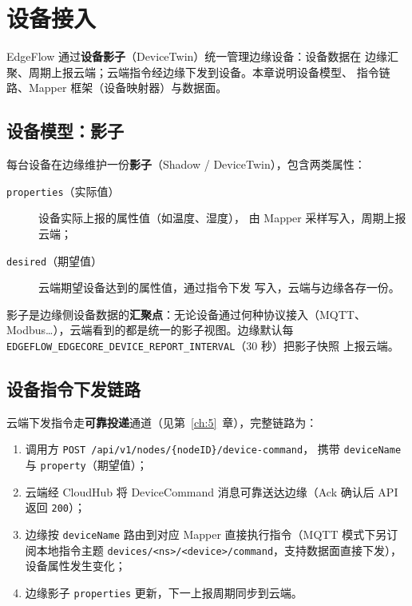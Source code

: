 \chapter{设备接入}
\label{ch:6}

EdgeFlow 通过\textbf{设备影子}（DeviceTwin）统一管理边缘设备：设备数据在
边缘汇聚、周期上报云端；云端指令经边缘下发到设备。本章说明设备模型、
指令链路、Mapper 框架（设备映射器）与数据面。

\section{设备模型：影子}

每台设备在边缘维护一份\textbf{影子}（Shadow / DeviceTwin），包含两类属性：

\begin{description}
  \item[\texttt{properties}（实际值）] 设备实际上报的属性值（如温度、湿度），
        由 Mapper 采样写入，周期上报云端；
  \item[\texttt{desired}（期望值）] 云端期望设备达到的属性值，通过指令下发
        写入，云端与边缘各存一份。
\end{description}

影子是边缘侧设备数据的\textbf{汇聚点}：无论设备通过何种协议接入（MQTT、
Modbus\ldots），云端看到的都是统一的影子视图。边缘默认每
\texttt{EDGEFLOW\_EDGECORE\_DEVICE\_REPORT\_INTERVAL}（30 秒）把影子快照
上报云端。

\section{设备指令下发链路}

云端下发指令走\textbf{可靠投递}通道（见第~\ref{ch:5}~章），完整链路为：

\begin{enumerate}
  \item 调用方 \texttt{POST /api/v1/nodes/\{nodeID\}/device-command}，
        携带 \texttt{deviceName} 与 \texttt{property}（期望值）；
  \item 云端经 CloudHub 将 DeviceCommand 消息可靠送达边缘（Ack 确认后
        API 返回 \texttt{200}）；
  \item 边缘按 \texttt{deviceName} 路由到对应 Mapper 直接执行指令（MQTT 模式下另订阅本地指令主题 \texttt{devices/<ns>/<device>/command}，支持数据面直接下发），设备属性发生变化；
  \item 边缘影子 \texttt{properties} 更新，下一上报周期同步到云端。
\end{enumerate}


